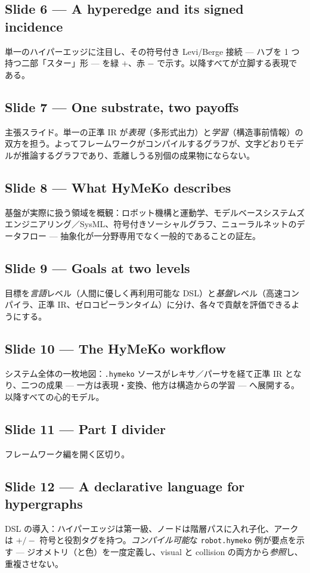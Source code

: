 \documentclass[10pt]{article}
\begin{document}
\subsection*{Slide 6 --- A hyperedge and its signed incidence}
単一のハイパーエッジに注目し、その符号付き Levi/Berge 接続 --- ハブを 1 つ持つ二部「スター」形 --- を緑 $+$、赤 $-$ で示す。以降すべてが立脚する表現である。

\subsection*{Slide 7 --- One substrate, two payoffs}
主張スライド。単一の正準 IR が\emph{表現}（多形式出力）と\emph{学習}（構造事前情報）の双方を担う。よってフレームワークがコンパイルするグラフが、文字どおりモデルが推論するグラフであり、乖離しうる別個の成果物にならない。

\subsection*{Slide 8 --- What HyMeKo describes}
基盤が実際に扱う領域を概観：ロボット機構と運動学、モデルベースシステムズエンジニアリング／SysML、符号付きソーシャルグラフ、ニューラルネットのデータフロー --- 抽象化が一分野専用でなく一般的であることの証左。

\subsection*{Slide 9 --- Goals at two levels}
目標を\emph{言語}レベル（人間に優しく再利用可能な DSL）と\emph{基盤}レベル（高速コンパイラ、正準 IR、ゼロコピーランタイム）に分け、各々で貢献を評価できるようにする。

\subsection*{Slide 10 --- The HyMeKo workflow}
システム全体の一枚地図：\texttt{.hymeko} ソースがレキサ／パーサを経て正準 IR となり、二つの成果 --- 一方は表現・変換、他方は構造からの学習 --- へ展開する。以降すべての心的モデル。

\subsection*{Slide 11 --- Part I divider}
フレームワーク編を開く区切り。

\subsection*{Slide 12 --- A declarative language for hypergraphs}
DSL の導入：ハイパーエッジは第一級、ノードは階層パスに入れ子化、アークは $+/-$ 符号と役割タグを持つ。\emph{コンパイル可能}な \texttt{robot.hymeko} 例が要点を示す --- ジオメトリ（と色）を一度定義し、visual と collision の両方から\emph{参照}し、重複させない。
\end{document}
